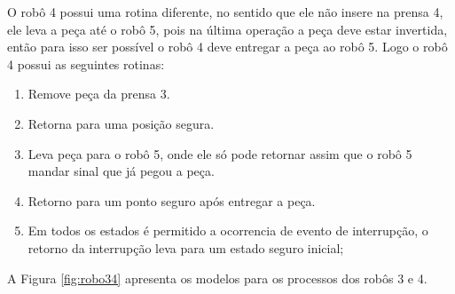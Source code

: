 O robô 4 possui uma rotina diferente, no sentido que ele não insere na prensa 4, ele leva a peça até o robô 5, pois na última operação a peça deve estar invertida, então para isso ser possível o robô 4 deve entregar a peça ao robô 5.
Logo o robô 4 possui as seguintes rotinas:

\begin{enumerate}
  \item Remove peça da prensa 3.
  \item Retorna para uma posição segura.
  \item Leva peça para o robô 5, onde ele só pode retornar assim que o robô 5 mandar sinal que já pegou a peça. 
  \item Retorno para um ponto seguro após entregar a peça.
  \item Em todos os estados é permitido a ocorrencia de evento de interrupção, o retorno da interrupção leva para um estado seguro inicial;
\end{enumerate}

A Figura \ref{fig:robo34} apresenta os modelos para os processos dos robôs 3 e 4.

